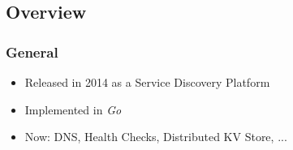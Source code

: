 


\subsection{Overview}

\begin{frame}
	\frametitle{General}
	\begin{itemize}
		\item Released in 2014 as a Service Discovery Platform
		\item Implemented in \emph{Go}
		\item Now: DNS, Health Checks, Distributed KV Store, ...
	\end{itemize}
\end{frame}

